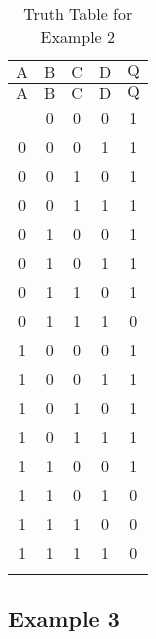 \documentclass[12pt]{article}
\begin{document}
\begin{longtable}{|c|c|c|c||c|}
	\hline
    $\mathrm{A}$  & $\mathrm{B}$ & $\mathrm{C}$ & $\mathrm{D}$ & $\mathrm{Q}$ \\
  \hline
	\endfirsthead
	\hline
   $\mathrm{A}$  & $\mathrm{B}$ & $\mathrm{C}$ & $\mathrm{D}$ & $\mathrm{Q}$ \\ \hline
	\endhead
	\hline
	\endfoot
	
  \endlastfoot
  0 & 0 & 0 & 0 & 1 \\ \hline
    0 & 0 & 0 & 1 & 1 \\  \hline
    0 & 0 & 1 & 0 & 1 \\  \hline
    0 & 0 & 1 & 1 & 1 \\  \hline
    0 & 1 & 0 & 0 & 1 \\  \hline
    0 & 1 & 0 & 1 & 1 \\  \hline
    0 & 1 & 1 & 0 & 1 \\  \hline
    0 & 1 & 1 & 1 & 0 \\  \hline
    1 & 0 & 0 & 0 & 1 \\  \hline
    1 & 0 & 0 & 1 & 1 \\  \hline
    1 & 0 & 1 & 0 & 1 \\  \hline
    1 & 0 & 1 & 1 & 1 \\  \hline
    1 & 1 & 0 & 0 & 1 \\  \hline
    1 & 1 & 0 & 1 & 0 \\  \hline
    1 & 1 & 1 & 0 & 0 \\  \hline
    1 & 1 & 1 & 1 & 0 \\  \hline
  \caption{Truth Table for Example 2}
  \end{longtable}



\subsection{Example 3}
\end{document}
